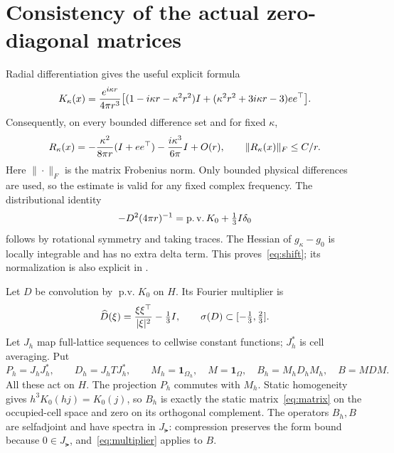 \documentclass[11pt]{article}
\theoremstyle{remark}\newtheorem{remark}[theorem]{Remark}
\newcommand{\pv}{\operatorname{p.v.}}\newcommand{\dist}{\operatorname{dist}}
\begin{document}
\section{Consistency of the actual zero-diagonal matrices}\label{sec:consistency}

Radial differentiation gives the useful explicit formula
\begin{equation}\label{eq:radial}
 K_\kappa(x)=\frac{e^{i\kappa r}}{4\pi r^3}
 \big[(1-i\kappa r-\kappa^2r^2)I
       +(\kappa^2r^2+3i\kappa r-3)ee^\top\big].
\end{equation}
Consequently, on every bounded difference set and for fixed $\kappa$,
\begin{equation}\label{eq:remainder}
 R_\kappa(x)=-\frac{\kappa^2}{8\pi r}(I+ee^\top)
             -\frac{i\kappa^3}{6\pi}I+O(r),
 \qquad \|R_\kappa(x)\|_F\le C/r.
\end{equation}
Here $\|\cdot\|_F$ is the matrix Frobenius norm. Only bounded physical differences are used, so the estimate is valid for any fixed complex frequency. The distributional identity
\[
 -D^2(4\pi r)^{-1}=\pv K_0+\tfrac13\Id\delta_0
\]
follows by rotational symmetry and taking traces. The Hessian of $g_\kappa-g_0$ is locally integrable and has no extra delta term. This proves~\eqref{eq:shift}; its normalization is also explicit in \cite[(1.7), (3.39)]{CDN}.

Let $D$ be convolution by $\pv K_0$ on $H$. Its Fourier multiplier is
\begin{equation}\label{eq:multiplier}
 \widehat D(\xi)=\frac{\xi\xi^\top}{|\xi|^2}-\tfrac13I,
 \qquad \sigma(D)\subset[-\tfrac13,\tfrac23].
\end{equation}
Let $J_h$ map full-lattice sequences to cellwise constant functions; $J_h^*$ is cell averaging. Put
\[
 P_h=J_hJ_h^*,\qquad D_h=J_hTJ_h^*,\qquad
 M_h=\mathbf1_{\Omega_h},\quad M=\mathbf1_\Omega,
 \quad B_h=M_hD_hM_h,\quad B=MDM.
\]
All these act on $H$. The projection $P_h$ commutes with $M_h$. Static homogeneity gives $h^3K_0(hj)=K_0(j)$, so $B_h$ is exactly the static matrix~\eqref{eq:matrix} on the occupied-cell space and zero on its orthogonal complement. The operators $B_h,B$ are selfadjoint and have spectra in $J_\lat$: compression preserves the form bound because $0\in J_\lat$, and~\eqref{eq:multiplier} applies to $B$.
\end{document}
